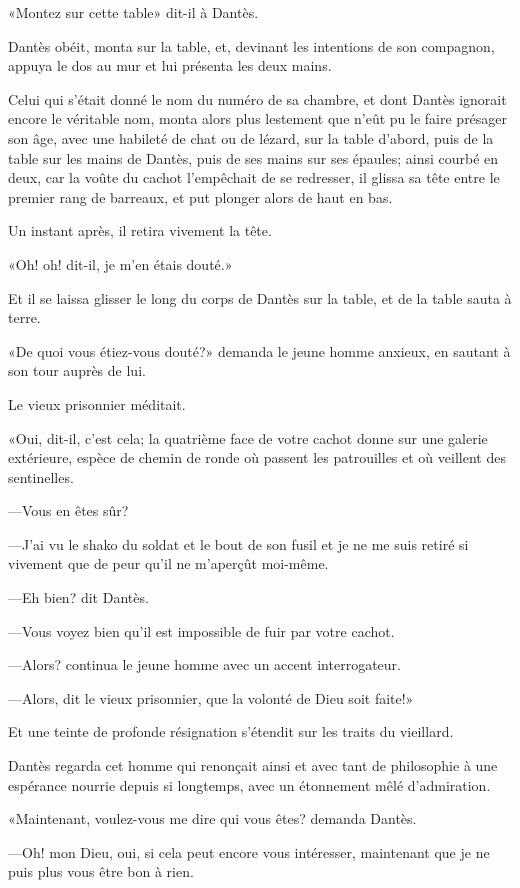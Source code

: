 «Montez sur cette table» dit-il à Dantès.

Dantès obéit, monta sur la table, et, devinant les intentions de son compagnon, appuya le dos au mur et lui présenta les deux mains.

Celui qui s'était donné le nom du numéro de sa chambre, et dont Dantès ignorait encore le véritable nom, monta alors plus lestement que n'eût pu le faire présager son âge, avec une habileté de chat ou de lézard, sur la table d'abord, puis de la table sur les mains de Dantès, puis de ses mains sur ses épaules; ainsi courbé en deux, car la voûte du cachot l'empêchait de se redresser, il glissa sa tête entre le premier rang de barreaux, et put plonger alors de haut en bas.

Un instant après, il retira vivement la tête.

«Oh! oh! dit-il, je m'en étais douté.»

Et il se laissa glisser le long du corps de Dantès sur la table, et de la table sauta à terre.

«De quoi vous étiez-vous douté?» demanda le jeune homme anxieux, en sautant à son tour auprès de lui.

Le vieux prisonnier méditait.

«Oui, dit-il, c'est cela; la quatrième face de votre cachot donne sur une galerie extérieure, espèce de chemin de ronde où passent les patrouilles et où veillent des sentinelles.

—Vous en êtes sûr?

—J'ai vu le shako du soldat et le bout de son fusil et je ne me suis retiré si vivement que de peur qu'il ne m'aperçût moi-même.

—Eh bien? dit Dantès.

—Vous voyez bien qu'il est impossible de fuir par votre cachot.

—Alors? continua le jeune homme avec un accent interrogateur.

—Alors, dit le vieux prisonnier, que la volonté de Dieu soit faite!»

Et une teinte de profonde résignation s'étendit sur les traits du vieillard.

Dantès regarda cet homme qui renonçait ainsi et avec tant de philosophie à une espérance nourrie depuis si longtemps, avec un étonnement mêlé d'admiration.

«Maintenant, voulez-vous me dire qui vous êtes? demanda Dantès.

—Oh! mon Dieu, oui, si cela peut encore vous intéresser, maintenant que je ne puis plus vous être bon à rien.

